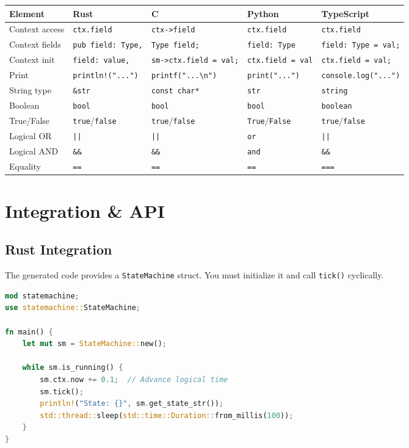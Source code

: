\documentclass[a4paper,11pt]{article}
\begin{document}
{\small
\begin{longtable}{@{}lllll@{}}
\toprule
\textbf{Element} & \textbf{Rust} & \textbf{C} & \textbf{Python} & \textbf{TypeScript} \\
\midrule
\endhead
Context access & \texttt{ctx.field} & \texttt{ctx->field} & \texttt{ctx.field} & \texttt{ctx.field} \\
Context fields & \texttt{pub field: Type,} & \texttt{Type field;} & \texttt{field: Type} & \texttt{field: Type = val;} \\
Context init & \texttt{field: value,} & \texttt{sm->ctx.field = val;} & \texttt{ctx.field = val} & \texttt{ctx.field = val;} \\
Print & \texttt{println!("...")} & \texttt{printf("...\textbackslash n")} & \texttt{print("...")} & \texttt{console.log("...")} \\
String type & \texttt{\&str} & \texttt{const char*} & \texttt{str} & \texttt{string} \\
Boolean & \texttt{bool} & \texttt{bool} & \texttt{bool} & \texttt{boolean} \\
True/False & \texttt{true}/\texttt{false} & \texttt{true}/\texttt{false} & \texttt{True}/\texttt{False} & \texttt{true}/\texttt{false} \\
Logical OR & \texttt{||} & \texttt{||} & \texttt{or} & \texttt{||} \\
Logical AND & \texttt{\&\&} & \texttt{\&\&} & \texttt{and} & \texttt{\&\&} \\
Equality & \texttt{==} & \texttt{==} & \texttt{==} & \texttt{===} \\
\bottomrule
\end{longtable}
}

\section{Integration \& API}

\subsection{Rust Integration}
The generated code provides a \texttt{StateMachine} struct. You must initialize it and call \texttt{tick()} cyclically.

\begin{lstlisting}[language=Rust, caption={Example Rust driver (main.rs)}]
mod statemachine;
use statemachine::StateMachine;

fn main() {
    let mut sm = StateMachine::new();

    while sm.is_running() {
        sm.ctx.now += 0.1;  // Advance logical time
        sm.tick();
        println!("State: {}", sm.get_state_str());
        std::thread::sleep(std::time::Duration::from_millis(100));
    }
}
\end{lstlisting}
\end{document}
